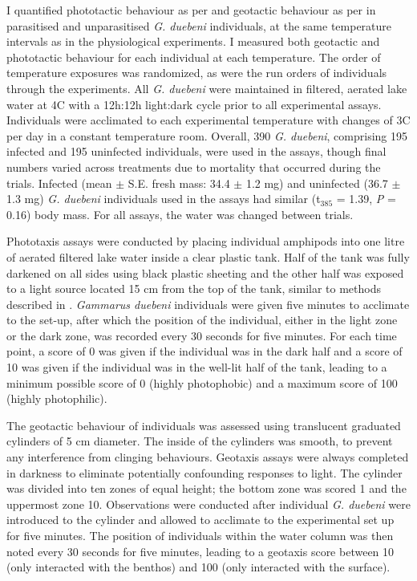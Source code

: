 I quantified phototactic behaviour as per \citet{perrot2004} and geotactic behaviour as per \citet{bauer2005} in parasitised and unparasitised \emph{G. duebeni} individuals, at the same temperature intervals as in the physiological experiments. I measured both geotactic and phototactic behaviour for each individual at each temperature. The order of temperature exposures was randomized, as were the run orders of individuals through the experiments. All \emph{G. duebeni} were maintained in filtered, aerated lake water at 4\degree C with a 12h:12h light:dark cycle prior to all experimental assays. Individuals were acclimated to each experimental temperature with changes of 3\degree C per day in a constant temperature room. Overall, 390 \emph{G. duebeni}, comprising 195 infected and 195 uninfected individuals, were used in the assays, though final numbers varied across treatments due to mortality that occurred during the trials. Infected (mean $\pm$ S.E. fresh mass: 34.4 $\pm$ 1.2 mg) and uninfected (36.7 $\pm$ 1.3 mg) \emph{G. duebeni} individuals used in the assays had similar (t$_385$ = 1.39, \emph{P} = 0.16) body mass. For all assays, the water was changed between trials. 

Phototaxis assays were conducted by placing individual amphipods into one litre of aerated filtered lake water inside a clear plastic tank. Half of the tank was fully darkened on all sides using black plastic sheeting and the other half was exposed to a light source located 15 cm from the top of the tank, similar to methods described in \citet{perrot2004}. \emph{Gammarus duebeni} individuals were given five minutes to acclimate to the set-up, after which the position of the individual, either in the light zone or the dark zone, was recorded every 30 seconds for five minutes. For each time point, a score of 0 was given if the individual was in the dark half and a score of 10 was given if the individual was in the well-lit half of the tank, leading to a minimum possible score of 0 (highly photophobic) and a maximum score of 100 (highly photophilic).  	

The geotactic behaviour of individuals was assessed using translucent graduated cylinders of 5 cm diameter. The inside of the cylinders was smooth, to prevent any interference from clinging behaviours. Geotaxis assays were always completed in darkness to eliminate potentially confounding responses to light. The cylinder was divided into ten zones of equal height; the bottom zone was scored 1 and the uppermost zone 10. Observations were conducted after individual \emph{G. duebeni} were introduced to the cylinder and allowed to acclimate to the experimental set up for five minutes. The position of individuals within the water column was then noted every 30 seconds for five minutes, leading to a geotaxis score between 10 (only interacted with the benthos) and 100 (only interacted with the surface).  

